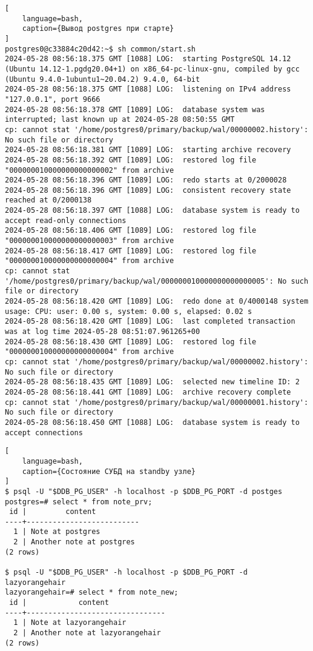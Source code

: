 \documentclass{article}
\begin{document}
\begin{lstlisting}[
    language=bash,
    caption={Вывод postgres при старте}
]
postgres0@c33884c20d42:~$ sh common/start.sh 
2024-05-28 08:56:18.375 GMT [1088] LOG:  starting PostgreSQL 14.12 (Ubuntu 14.12-1.pgdg20.04+1) on x86_64-pc-linux-gnu, compiled by gcc (Ubuntu 9.4.0-1ubuntu1~20.04.2) 9.4.0, 64-bit
2024-05-28 08:56:18.375 GMT [1088] LOG:  listening on IPv4 address "127.0.0.1", port 9666
2024-05-28 08:56:18.378 GMT [1089] LOG:  database system was interrupted; last known up at 2024-05-28 08:50:55 GMT
cp: cannot stat '/home/postgres0/primary/backup/wal/00000002.history': No such file or directory
2024-05-28 08:56:18.381 GMT [1089] LOG:  starting archive recovery
2024-05-28 08:56:18.392 GMT [1089] LOG:  restored log file "000000010000000000000002" from archive
2024-05-28 08:56:18.396 GMT [1089] LOG:  redo starts at 0/2000028
2024-05-28 08:56:18.396 GMT [1089] LOG:  consistent recovery state reached at 0/2000138
2024-05-28 08:56:18.397 GMT [1088] LOG:  database system is ready to accept read-only connections
2024-05-28 08:56:18.406 GMT [1089] LOG:  restored log file "000000010000000000000003" from archive
2024-05-28 08:56:18.417 GMT [1089] LOG:  restored log file "000000010000000000000004" from archive
cp: cannot stat '/home/postgres0/primary/backup/wal/000000010000000000000005': No such file or directory
2024-05-28 08:56:18.420 GMT [1089] LOG:  redo done at 0/4000148 system usage: CPU: user: 0.00 s, system: 0.00 s, elapsed: 0.02 s
2024-05-28 08:56:18.420 GMT [1089] LOG:  last completed transaction was at log time 2024-05-28 08:51:07.961265+00
2024-05-28 08:56:18.430 GMT [1089] LOG:  restored log file "000000010000000000000004" from archive
cp: cannot stat '/home/postgres0/primary/backup/wal/00000002.history': No such file or directory
2024-05-28 08:56:18.435 GMT [1089] LOG:  selected new timeline ID: 2
2024-05-28 08:56:18.441 GMT [1089] LOG:  archive recovery complete
cp: cannot stat '/home/postgres0/primary/backup/wal/00000001.history': No such file or directory
2024-05-28 08:56:18.450 GMT [1088] LOG:  database system is ready to accept connections
\end{lstlisting}

\begin{lstlisting}[
    language=bash,
    caption={Состояние СУБД на standby узле}
]
$ psql -U "$DDB_PG_USER" -h localhost -p $DDB_PG_PORT -d postges 
postgres=# select * from note_prv;
 id |         content          
----+--------------------------
  1 | Note at postgres
  2 | Another note at postgres
(2 rows)

$ psql -U "$DDB_PG_USER" -h localhost -p $DDB_PG_PORT -d lazyorangehair
lazyorangehair=# select * from note_new;
 id |            content             
----+--------------------------------
  1 | Note at lazyorangehair
  2 | Another note at lazyorangehair
(2 rows)
\end{lstlisting}
\end{document}

